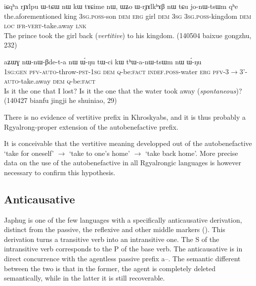 \documentclass[oldfontcommands,oneside,a4paper,11pt]{article}
\newcommand{\ipa}[1]{{\phon \mbox{#1}}} %
\begin{document}
\begin{exe}
\ex \label{ex:jonWtsWm}
\gll
\ipa{iɕqʰa} 	\ipa{rɟɤlpu} 	\ipa{ɯ-tɕɯ} 	\ipa{nɯ} 	\ipa{kɯ} 	\ipa{tɤɕime} 	\ipa{nɯ,} 	\ipa{ɯʑo} 	\ipa{ɯ-rɟɤlkʰɤβ} 	\ipa{nɯ} 	\ipa{tɕu} 	\ipa{jo-nɯ-tsɯm} 	\ipa{qʰe} \\
the.aforementioned king \textsc{3sg.poss}-son \textsc{dem} \textsc{erg} girl \textsc{dem} \textsc{3sg} \textsc{3sg.poss}-kingdom \textsc{dem} \textsc{loc} \textsc{ifr-vert}-take.away \textsc{lnk} \\
\glt The prince took the girl back (\textit{vertitive}) to his kingdom. (140504 baixue gongzhu, 232)
\end{exe}



\begin{exe}
\ex \label{ex:thanWtsWm}
\gll
\ipa{aʑɯɣ} 	\ipa{nɯ-nɯ-βde-t-a} 	\ipa{nɯ} 	\ipa{ɯ́-ŋu} 	\ipa{tɯ-ci} 	\ipa{kɯ} 	\ipa{tʰɯ-a-nɯ-tsɯm} 	\ipa{nɯ} 	\ipa{ɯ́-ŋu} \\
\textsc{1sg:gen} \textsc{pfv-auto}-throw-\textsc{pst-1sg} \textsc{dem} \textsc{q}-be:\textsc{fact} \textsc{indef.poss}-water \textsc{erg} \textsc{pfv}-3$\rightarrow$3'-\textsc{auto}-take.away \textsc{dem} \textsc{q}-be:\textsc{fact} \\
\glt Is it the one that I lost? Is it the one that the water took away (\textit{spontaneous})? (140427 bianfu jingji he shuiniao, 29)
\end{exe}


There is no evidence of vertitive prefix in Khroskyabs, and it is thus probably a Rgyalrong-proper extension of the autobenefactive prefix.


It is conceivable that the vertitive meaning developped out of the autobenefactive `take for oneself' $\rightarrow$ `take to one's home' $\rightarrow$ `take back home'. More precise data on the use of the autobenefactive in all Rgyalrongic languages is however necessary to confirm this hypothesis.

\subsection{Anticausative}
Japhug is one of the few languages with a specifically anticausative derivation, distinct from the passive, the reflexive and other middle markers (\citealt{jacques12demotion}). This derivation turns a transitive verb into an intransitive one. The S of the intransitive verb corresponds to the P of the base verb. The anticausative is in direct concurrence with the agentless passive prefix \ipa{a--}. The semantic different between the two is that in the former, the agent is completely deleted semantically, while in the latter it is still recoverable.
\end{document}
